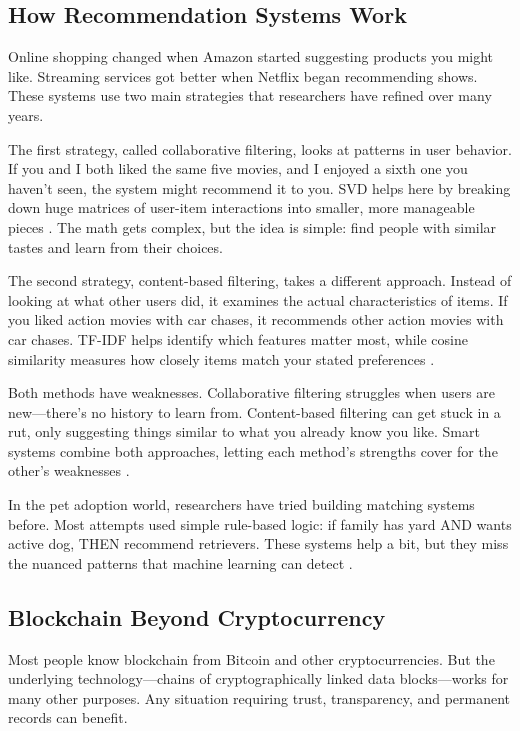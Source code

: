 \documentclass[conference]{IEEEtran}
\begin{document}
\subsection{How Recommendation Systems Work}

Online shopping changed when Amazon started suggesting products you might like. Streaming services got better when Netflix began recommending shows. These systems use two main strategies that researchers have refined over many years.

The first strategy, called collaborative filtering, looks at patterns in user behavior. If you and I both liked the same five movies, and I enjoyed a sixth one you haven't seen, the system might recommend it to you. SVD helps here by breaking down huge matrices of user-item interactions into smaller, more manageable pieces \cite{matrixfactor2022}. The math gets complex, but the idea is simple: find people with similar tastes and learn from their choices.

The second strategy, content-based filtering, takes a different approach. Instead of looking at what other users did, it examines the actual characteristics of items. If you liked action movies with car chases, it recommends other action movies with car chases. TF-IDF helps identify which features matter most, while cosine similarity measures how closely items match your stated preferences \cite{contentbased2023}.

Both methods have weaknesses. Collaborative filtering struggles when users are new—there's no history to learn from. Content-based filtering can get stuck in a rut, only suggesting things similar to what you already know you like. Smart systems combine both approaches, letting each method's strengths cover for the other's weaknesses \cite{hybrid2024}.

In the pet adoption world, researchers have tried building matching systems before. Most attempts used simple rule-based logic: if family has yard AND wants active dog, THEN recommend retrievers. These systems help a bit, but they miss the nuanced patterns that machine learning can detect \cite{petmatching2022}.

\subsection{Blockchain Beyond Cryptocurrency}

Most people know blockchain from Bitcoin and other cryptocurrencies. But the underlying technology—chains of cryptographically linked data blocks—works for many other purposes. Any situation requiring trust, transparency, and permanent records can benefit.
\end{document}
